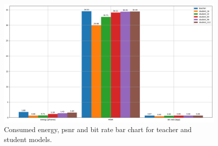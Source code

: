 \begin{figure}
    \centering
    \includegraphics[width=15cm]{img/kd_lic_bar_energy.png}
    \caption[Consumed energy, \acrshort{psnr} and bit rate bar chart for teacher and student models.]{Consumed energy, \acrshort{psnr} and bit rate bar chart for teacher and student models.}
    \label{appendix:kd_lic_bar_energy}
\end{figure}

